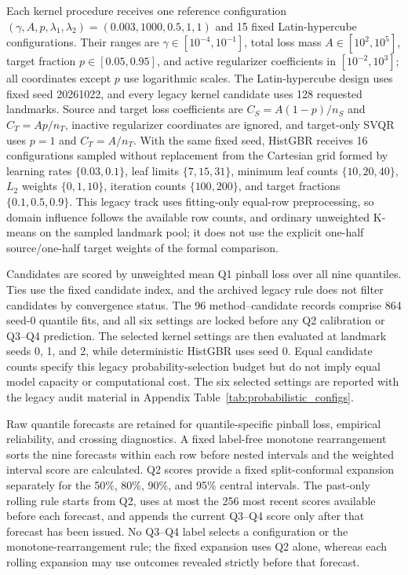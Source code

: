 {\color{blue}Each kernel procedure receives one reference configuration $(\gamma,A,p,\lambda_1,\lambda_2)=(0.003,1000,0.5,1,1)$ and 15 fixed Latin-hypercube configurations. Their ranges are $\gamma\in[10^{-4},10^{-1}]$, total loss mass $A\in[10^2,10^5]$, target fraction $p\in[0.05,0.95]$, and active regularizer coefficients in $[10^{-2},10^3]$; all coordinates except $p$ use logarithmic scales. The Latin-hypercube design uses fixed seed 20261022, and every legacy kernel candidate uses 128 requested landmarks. Source and target loss coefficients are $C_S=A(1-p)/n_S$ and $C_T=Ap/n_T$, inactive regularizer coordinates are ignored, and target-only SVQR uses $p=1$ and $C_T=A/n_T$. With the same fixed seed, HistGBR receives 16 configurations sampled without replacement from the Cartesian grid formed by learning rates $\{0.03,0.1\}$, leaf limits $\{7,15,31\}$, minimum leaf counts $\{10,20,40\}$, $L_2$ weights $\{0,1,10\}$, iteration counts $\{100,200\}$, and target fractions $\{0.1,0.5,0.9\}$. This legacy track uses fitting-only equal-row preprocessing, so domain influence follows the available row counts, and ordinary unweighted K-means on the sampled landmark pool; it does not use the explicit one-half source/one-half target weights of the formal comparison.}

{\color{blue}Candidates are scored by unweighted mean Q1 pinball loss over all nine quantiles. Ties use the fixed candidate index, and the archived legacy rule does not filter candidates by convergence status. The 96 method--candidate records comprise 864 seed-0 quantile fits, and all six settings are locked before any Q2 calibration or Q3--Q4 prediction. The selected kernel settings are then evaluated at landmark seeds 0, 1, and 2, while deterministic HistGBR uses seed 0. Equal candidate counts specify this legacy probability-selection budget but do not imply equal model capacity or computational cost. The six selected settings are reported with the legacy audit material in Appendix Table~\ref{tab:probabilistic_configs}.}

{\color{blue}Raw quantile forecasts are retained for quantile-specific pinball loss, empirical reliability, and crossing diagnostics. A fixed label-free monotone rearrangement sorts the nine forecasts within each row before nested intervals and the weighted interval score are calculated. Q2 scores provide a fixed split-conformal expansion separately for the 50\%, 80\%, 90\%, and 95\% central intervals. The past-only rolling rule starts from Q2, uses at most the 256 most recent scores available before each forecast, and appends the current Q3--Q4 score only after that forecast has been issued. No Q3--Q4 label selects a configuration or the monotone-rearrangement rule; the fixed expansion uses Q2 alone, whereas each rolling expansion may use outcomes revealed strictly before that forecast.}

